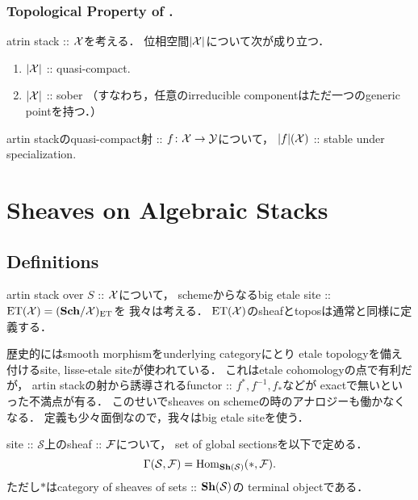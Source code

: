 \documentclass[a4paper, dvipdfmx]{jsarticle}
\begin{document}
\subsubsection{Topological Property of .}
\begin{Prop}
    atrin stack :: $\mathcal{X}$を考える．
    位相空間$|\mathcal{X}|$について次が成り立つ．
    \begin{enumerate}
        \item $|\mathcal{X}|$ :: quasi-compact.
        \item $|\mathcal{X}|$ :: sober
            （すなわち，任意のirreducible componentはただ一つのgeneric pointを持つ．）
    \end{enumerate}
\end{Prop}

\begin{Prop}
    artin stackのquasi-compact射 :: $f \colon \mathcal{X} \to \mathcal{Y}$について，
    $|f|(\mathcal{X})$ :: stable under specialization.
\end{Prop}

\section{Sheaves on Algebraic Stacks}

\subsection{Definitions}
artin stack over $S$ :: $\mathcal{X}$について，
schemeからなるbig etale site :: $\mathrm{ET}(\mathcal{X})=(\mathbf{Sch}/\mathcal{X})_{\mathrm{ET}}$を
我々は考える．
$\mathrm{ET}(\mathcal{X})$のsheafとtoposは通常と同様に定義する．

\begin{Remark}
    歴史的にはsmooth morphismをunderlying categoryにとり
    etale topologyを備え付けるsite, lisse-etale siteが使われている．
    これはetale cohomologyの点で有利だが，
    artin stackの射から誘導されるfunctor :: $f^*, f^{-1}, f_*$などが
    exactで無いといった不満点が有る．
    このせいでsheaves on schemeの時のアナロジーも働かなくなる．
    定義も少々面倒なので，我々はbig etale siteを使う．
\end{Remark}

\begin{Def}
    site :: $\mathcal{S}$上のsheaf :: $\mathcal{F}$について，
    set of global sectionsを以下で定める．
    \[ \Gamma(\mathcal{S}, \mathcal{F})=\operatorname{Hom}_{\mathbf{Sh}(\mathcal{S})}(*, \mathcal{F}). \]
    ただし$*$はcategory of sheaves of sets :: $\mathbf{Sh}(\mathcal{S})$の
    terminal objectである．
\end{Def}
\end{document}
